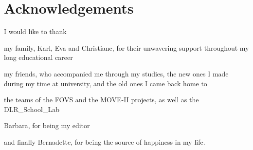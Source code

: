 \cleardoublepage
\section*{Acknowledgements}

I would like to thank

my family, Karl, Eva and Christiane, for their unwavering support throughout my long educational career

my friends, who accompanied me through my studies, the new ones I made during my time at university, and the old ones I came back home to

the teams of the FOVS and the MOVE-II projects, as well as the DLR\_School\_Lab

Barbara, for being my editor

and finally Bernadette, for being the source of happiness in my life.

